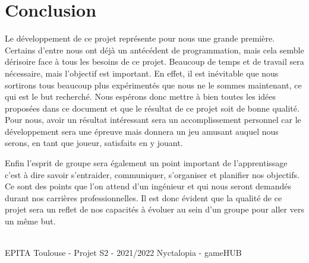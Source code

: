\section{Conclusion}

Le développement de ce projet représente pour nous une grande première.
Certains d’entre nous ont déjà un antécédent de programmation, mais cela
semble dérisoire face à tous les besoins de ce projet. Beaucoup de temps et de
travail sera nécessaire, mais l’objectif est important. En effet, il est inévitable
que nous sortirons tous beaucoup plus expérimentés que nous ne le sommes maintenant, ce qui est le but recherché. Nous espérons donc mettre à bien toutes les
idées proposées dans ce document et que le résultat de ce projet soit de bonne
qualité. Pour nous, avoir un résultat intéressant sera un accomplissement personnel car le développement sera une épreuve mais donnera un jeu amusant
auquel nous serons, en tant que joueur, satisfaits en y jouant.

Enfin l'esprit de groupe sera également un point important de l'apprentissage c'est à dire savoir s'entraider, communiquer, s'organiser et planifier nos objectifs. Ce sont des points que l'on attend d'un ingénieur et qui nous seront demandés durant nos carrières professionnelles. Il est donc évident que la qualité de ce projet sera un reflet de nos capacités à évoluer au sein d'un groupe pour aller vers un même but.

\vfill
\noindent\makebox[\linewidth]{\rule{.8\paperwidth}{.6pt}}\\[0.2cm]
EPITA Toulouse - Projet S2 - 2021/2022 \hfill Nyctalopia - gameHUB
\noindent\makebox[\linewidth]{\rule{.8\paperwidth}{.6pt}}

\newpage